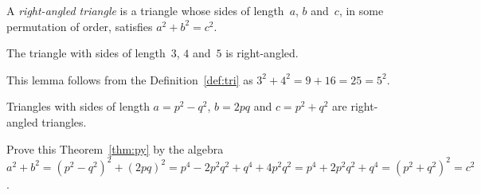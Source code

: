 \documentclass[12pt,a4paper]{extarticle}
\begin{document}
\begin{definition} \label{def:tri}
A \emph{right-angled triangle} is a triangle whose sides of length~\(a\), \(b\) and~\(c\), in some permutation of order, satisfies \(a^2+b^2=c^2\).
\end{definition}

\begin{lemma} 
The triangle with sides of length~\(3\), \(4\) and~\(5\) is right-angled.
\end{lemma}

This lemma follows from the Definition~\ref{def:tri} as \(3^2+4^2=9+16=25=5^2\).

\begin{theorem} \label{thm:py}
Triangles with sides of length \(a=p^2-q^2\), \(b=2pq\) and \(c=p^2+q^2\) are right-angled triangles.
\end{theorem}

Prove this Theorem~\ref{thm:py} by the algebra \(a^2+b^2 =(p^2-q^2)^2+(2pq)^2
=p^4-2p^2q^2+q^4+4p^2q^2
=p^4+2p^2q^2+q^4
=(p^2+q^2)^2 =c^2\).
\end{document}
